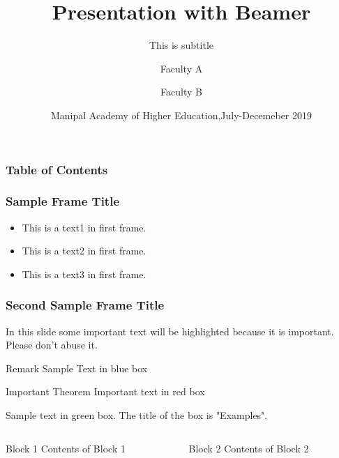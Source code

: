 \documentclass{beamer}
\title[About Beamer]{Presentation with Beamer}
\subtitle{This is subtitle}
\author[Author 1,Author 2]{Faculty A \inst{1} \and Faculty B \inst{2}}
\institute{MIT,Manipal,MAHE}
\date[Dept of CSE 2019]{Manipal Academy of Higher Education,July-Decemeber 2019}
\begin{document}
		\frame{\titlepage}
		
		\begin{frame}
			\frametitle{Table of Contents}
			\tableofcontents[currentsection]
		\end{frame}
	
		\begin{frame}
			\frametitle{Sample Frame Title}
			\begin{itemize}
				\item This is a text1 in first frame.
			
				\item This is a text2 in first frame.
				
				\item This is a text3 in first frame.
				
			\end{itemize}
			
		\end{frame}
		
		\begin{frame}
			\frametitle{Second Sample Frame Title}
			In this slide some important text will be \alert{highlighted} because it is important.
			Please don't abuse it.
			
			\begin{block}{Remark}
				Sample Text in blue box
			\end{block} 
		
			\begin{alertblock}{Important Theorem}
				Important text in red box
			\end{alertblock}
		
			\begin{examples}
				Sample text in green box. The title of the box is "Examples".
			\end{examples}
					
		\end{frame}
	
		\begin{columns}
			\begin{column}[]{.3\textwidth}
				\begin{block}{Block 1}
					Contents of Block 1
				\end{block}
			\end{column}
		
			\begin{column}[]{.3\textwidth}
			\begin{block}{Block 2}
				Contents of Block 2
			\end{block}
			\end{column}
		\end{columns}
	
\end{document}
